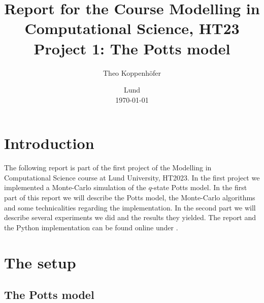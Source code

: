 




\title{ Report for the Course Modelling in Computational Science, HT23 \\[1ex]
	  \large Project 1: The Potts model}
\author{Theo Koppenhöfer}
\date{Lund \\[1ex] \today}



\usepackage{pythonhighlight}
\usepackage{pgfplots}
\graphicspath{{../Figures/}}






\maketitle

\section{Introduction}

The following report is part of the first project of the Modelling in Computational Science course at Lund University, HT2023.
In the first project we implemented a Monte-Carlo simulation of the $q$-state Potts model. In the first part of this report we will describe the Potts model, the Monte-Carlo algorithms and some technicalities regarding the implementation. In the second part we will describe several experiments we did and the results they yielded.
The report and the Python implementation can be found online under \cite{Repository}.

\section{The setup}

\subsection{The Potts model}

